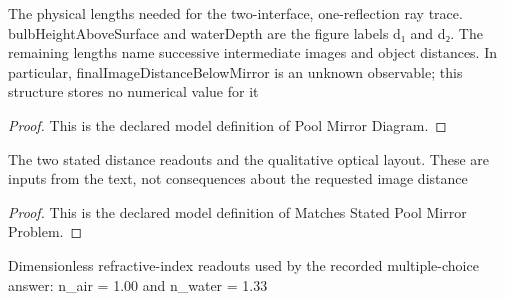 \begin{definition}
  \label{def:physics:phyx-mini-0161:phyxminiproblems-problemphyxmini0161-poolmirrordiagram}
  The physical lengths needed for the two-interface, one-reflection ray trace. bulbHeightAboveSurface and waterDepth are the figure labels d₁ and d₂. The remaining lengths name successive intermediate images and object distances. In particular, finalImageDistanceBelowMirror is an unknown observable; this structure stores no numerical value for it
\end{definition}
\begin{proof}
  This is the declared model definition of Pool Mirror Diagram.
\end{proof}
\begin{definition}
  \label{def:physics:phyx-mini-0161:phyxminiproblems-problemphyxmini0161-matchesstatedpoolmirrorproblem}
  The two stated distance readouts and the qualitative optical layout. These are inputs from the text, not consequences about the requested image distance
\end{definition}
\begin{proof}
  This is the declared model definition of Matches Stated Pool Mirror Problem.
\end{proof}
\begin{definition}
  \label{def:physics:phyx-mini-0161:phyxminiproblems-problemphyxmini0161-usesstandardairwaterindices}
  Dimensionless refractive-index readouts used by the recorded multiple-choice answer: n\_air = 1.00 and n\_water = 1.33
\end{definition}
